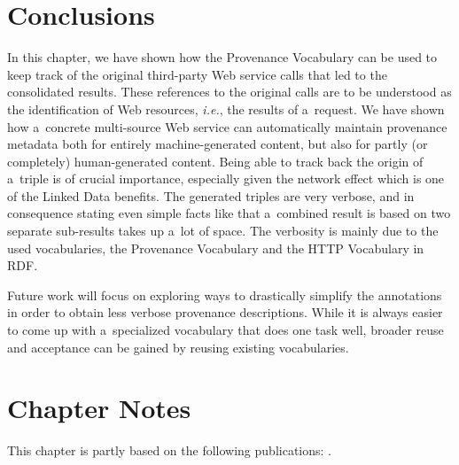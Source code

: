 \section{Conclusions}                                                        

In this chapter, we have shown how the Provenance
Vocabulary can be used to keep track of the original
third-party Web service calls that led to the consolidated
results. These references to the original calls
are to be understood as the identification of Web resources,
\emph{i.e.}, the results of a~request.
We have shown how a~concrete multi-source Web service can
automatically maintain provenance metadata
both for entirely machine-generated content,
but also for partly (or completely) human-generated content.
Being able to track back the origin of a~triple
is of crucial importance,
especially given the network effect which is one of the
Linked Data benefits.
The generated triples are very verbose,
and in consequence stating even simple facts like
that a~combined result is based on two separate sub-results
takes up a~lot of space.
The verbosity is mainly due to the used vocabularies,
the Provenance Vocabulary and the HTTP Vocabulary in RDF.

Future work will focus on exploring ways
to drastically simplify the annotations in order to obtain
less verbose provenance descriptions.
While it is always easier to come up with a~specialized vocabulary
that does one task well, broader reuse and acceptance
can be gained by reusing existing vocabularies.

\section*{Chapter Notes}
This chapter is partly based on the following publications:
\cite{steiner2011addingmeaning,steiner2013addingmeaning,van2013named}.


\clearpage

